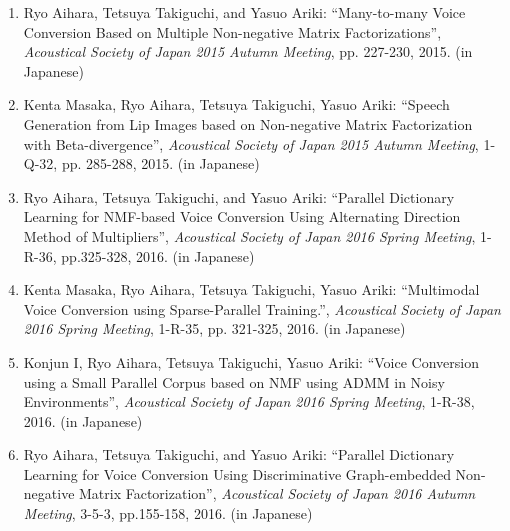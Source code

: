 \begin{enumerate}
\item Ryo Aihara, Tetsuya Takiguchi, and Yasuo Ariki:
``Many-to-many Voice Conversion Based on Multiple Non-negative Matrix Factorizations'',
\textit{Acoustical Society of Japan 2015 Autumn Meeting}, pp. 227-230, 2015. (in Japanese)

\item Kenta Masaka, Ryo Aihara, Tetsuya Takiguchi, Yasuo Ariki:
``Speech Generation from Lip Images based on Non-negative Matrix Factorization with Beta-divergence'',
\textit{Acoustical Society of Japan 2015 Autumn Meeting}, 1-Q-32, pp. 285-288, 2015. (in Japanese)

\item Ryo Aihara, Tetsuya Takiguchi, and Yasuo Ariki:
``Parallel Dictionary Learning for NMF-based Voice Conversion Using Alternating Direction Method of Multipliers'',
\textit{Acoustical Society of Japan 2016 Spring Meeting}, 1-R-36, pp.325-328, 2016. (in Japanese)

\item Kenta Masaka, Ryo Aihara, Tetsuya Takiguchi, Yasuo Ariki:
``Multimodal Voice Conversion using Sparse-Parallel Training.'',
\textit{Acoustical Society of Japan 2016 Spring Meeting}, 1-R-35, pp. 321-325, 2016. (in Japanese)

\item Konjun I, Ryo Aihara, Tetsuya Takiguchi, Yasuo Ariki:
``Voice Conversion using a Small Parallel Corpus based on NMF using ADMM in Noisy Environments'',
\textit{Acoustical Society of Japan 2016 Spring Meeting}, 1-R-38, 2016. (in Japanese)

\item Ryo Aihara, Tetsuya Takiguchi, and Yasuo Ariki:
``Parallel Dictionary Learning for Voice Conversion Using Discriminative Graph-embedded Non-negative Matrix Factorization'',
\textit{Acoustical Society of Japan 2016 Autumn Meeting}, 3-5-3, pp.155-158, 2016. (in Japanese)

\end{enumerate}
\label{chap:endPubList}






